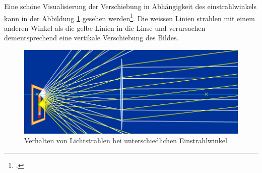 Eine   sch\"one  Visualisierung   der  Verschiebung   in  Abh\"angigkeit   des
einstrahlwinkels  kann  in  der Abbildung  \ref{fig:lense-simulation}  gesehen
werden\footcite{ref:linsen-simulation}. Die   weissen   Linien  strahlen   mit
einem  anderen Winkel  als  die  gelbe Linien  in  die  Linse und  verursachen
dementsprechend eine vertikale Verschiebung des Bildes.

\begin{figure}[H]
    \center
    \includegraphics[width=.8\textwidth]{images/lense-simulation.png}
    \caption{Verhalten von Lichtstrahlen bei unterschiedlichen Einstrahlwinkel}
    \label{fig:lense-simulation}
\end{figure}


